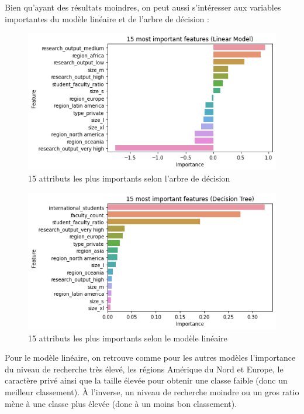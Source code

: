 \documentclass[twocolumns]{udes_rapport}
\begin{document}
        Bien qu'ayant des résultats moindres, on peut aussi s'intéresser aux variables importantes du modèle linéaire et de l'arbre de décision :
        
        \begin{figure}[h!]
            \centering
            \includegraphics[scale=0.5]{Images/important_features_lm.png}
            \caption{15 attributs les plus importants selon l'arbre de décision}
            \label{fig:imp_features_xgbreg}
        \end{figure}
        
        \begin{figure}[h!]
            \centering
            \includegraphics[scale=0.5]{Images/important_features_tree.png}
            \caption{15 attributs les plus importants selon le modèle linéaire}
            \label{fig:imp_features_xgbclf}
        \end{figure}
        
        Pour le modèle linéaire, on retrouve comme pour les autres modèles l'importance du niveau de recherche très élevé, les régions Amérique du Nord et Europe, le caractère privé ainsi que la taille élevée pour obtenir une classe faible (donc un meilleur classement). À l'inverse, un niveau de recherche moindre ou un gros ratio mène à une classe plus élevée (donc à un moins bon classement).
        
\end{document}
